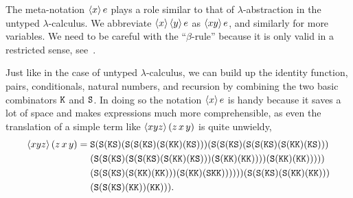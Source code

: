 The meta-notation $\langle x \rangle\,e$ plays a role similar to that of
$\lambda$-abstraction in the untyped $\lambda$-calculus. We abbreviate
$\langle x \rangle\,\langle y \rangle\,e$ as $\langle x y \rangle\,e$, and similarly for
more variables. We need to be careful with the ``$\beta$-rule''
because it is only valid in a restricted sense,
see~\cite{LongleyJ:reatls}.

Just like in the case of untyped $\lambda$-calculus, we can build up
the identity function, pairs, conditionals, natural numbers, and
recursion by combining the two basic combinators $\mathtt{K}$ and
$\mathtt{S}$. In doing so the notation $\langle x \rangle\,e$ is handy because it
saves a lot of space and makes expressions much more comprehensible,
as even the translation of a simple term like $\langle x y z \rangle\,(z\, x\,
  y)$ is quite unwieldy,
%
\begin{equation*}
  \langle x y z \rangle\,(z\, x\, y) =
  \begin{aligned}[t]
  & {\mathtt{S}} (
    {\mathtt{S}} ({\mathtt{K}}{\mathtt{S}}) (
      {\mathtt{S}}({\mathtt{S}}({\mathtt{K}}{\mathtt{S}})({\mathtt{S}}({\mathtt{K}}{\mathtt{K}})({\mathtt{K}}{\mathtt{S}}))) (
        {\mathtt{S}} (
          {\mathtt{S}} ({\mathtt{K}}{\mathtt{S}}) (
            {\mathtt{S}}({\mathtt{S}}({\mathtt{K}}{\mathtt{S}})({\mathtt{S}}({\mathtt{K}}{\mathtt{K}})({\mathtt{K}}{\mathtt{S}}))) \\ & (
              {\mathtt{S}}({\mathtt{S}}({\mathtt{K}}{\mathtt{S}})({\mathtt{S}}({\mathtt{S}}({\mathtt{K}}{\mathtt{S}})({\mathtt{S}}({\mathtt{K}}{\mathtt{K}})({\mathtt{K}}{\mathtt{S}})))({\mathtt{S}}({\mathtt{K}}{\mathtt{K}})({\mathtt{K}}{\mathtt{K}}))))(
              {\mathtt{S}}({\mathtt{K}}{\mathtt{K}})({\mathtt{K}}{\mathtt{K}}))
            )
          )
        ) \\ &
   (
          {\mathtt{S}}({\mathtt{S}}({\mathtt{K}}{\mathtt{S}})({\mathtt{S}}({\mathtt{K}}{\mathtt{K}})({\mathtt{K}}{\mathtt{K}})))({\mathtt{S}}({\mathtt{K}}{\mathtt{K}})({\mathtt{S}}{\mathtt{K}}{\mathtt{K}}))
          )
      )
    )
  ) (
    {\mathtt{S}}({\mathtt{S}}({\mathtt{K}}{\mathtt{S}})({\mathtt{S}}({\mathtt{K}}{\mathtt{K}})({\mathtt{K}}{\mathtt{K}}))) \\ & ({\mathtt{S}}({\mathtt{S}}({\mathtt{K}}{\mathtt{S}})({\mathtt{K}}{\mathtt{K}}))({\mathtt{K}}{\mathtt{K}}))
  ).
  \end{aligned}
\end{equation*}
%


